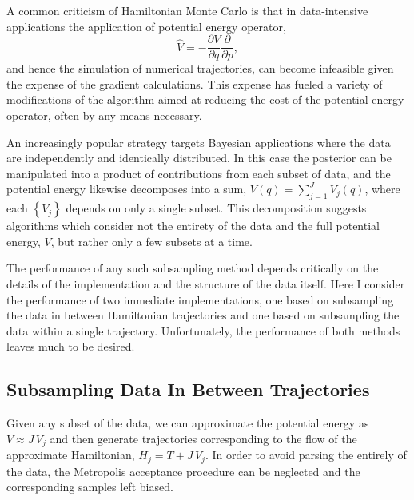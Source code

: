 \documentclass{article}
\begin{document}
A common criticism of Hamiltonian Monte Carlo is that in data-intensive applications 
the application of potential energy operator,
%
\begin{equation*}
\hat{V} = - \frac{ \partial V }{ \partial q } \frac{ \partial }{ \partial p},
\end{equation*}
%
and hence the simulation of numerical trajectories, can become infeasible given the 
expense of the gradient calculations.  This expense has fueled a variety of modifications 
of the algorithm aimed at reducing the cost of the potential energy operator, often by 
any means necessary.

An increasingly popular strategy targets Bayesian applications where the data are 
independently and identically distributed.  In this case the posterior can be manipulated
into a product of contributions from each subset of data, and the potential energy
likewise decomposes into a sum,
%
$V (q) = \sum_{j = 1}^{J} V_{j} (q)$,
%
where each $\left\{ V_{j} \right\}$ depends on only a single subset.  This decomposition 
suggests algorithms which consider not the entirety of the data and the full potential
energy, $V$, but rather only a few subsets at a time.

The performance of any such subsampling method depends critically on the details
of the implementation and the structure of the data itself.  Here I consider the performance 
of two immediate implementations, one based on subsampling the data in between 
Hamiltonian trajectories and one based on subsampling the data within a single trajectory.  
Unfortunately, the performance of both methods leaves much to be desired.

\subsection{Subsampling Data In Between Trajectories}

Given any subset of the data, we can approximate the potential energy as 
$V \approx J \, V_{j}$ and then generate trajectories corresponding to the flow of the 
approximate Hamiltonian, $H_{j} = T + J \, V_{j}$.  In order to avoid parsing the entirely
of the data, the Metropolis acceptance procedure can be neglected and the 
corresponding samples left biased.
\end{document}
